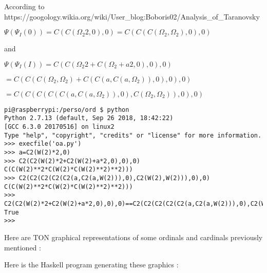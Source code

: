 \documentclass[10pt]{article}
\begin{document}
According to https://googology.wikia.org/wiki/User\_blog:Boboris02/Analysis\_of\_Taranovsky%

$\Psi(\Psi_I(0)) = C(C(\Omega_2 2,0),0) = C(C(C(\Omega_2,\Omega_2),0),0)$

and

$ \Psi(\Psi_I(I)) = C(C(\Omega_2 2+C(\Omega_2+a 2,0),0),0) $

$  = C(C(C(\Omega_2,\Omega_2)+C(C(a,C(a,\Omega_2)),0),0),0) $
 
$  = C(C(C(C(C(a,C(a,\Omega_2)),0),C(\Omega_2,\Omega_2)),0),0) $

\begin{verbatim}
pi@raspberrypi:/perso/ord $ python
Python 2.7.13 (default, Sep 26 2018, 18:42:22)
[GCC 6.3.0 20170516] on linux2
Type "help", "copyright", "credits" or "license" for more information.
>>> execfile('oa.py')
>>> a=C2(W(2)*2,0)
>>> C2(C2(W(2)*2+C2(W(2)+a*2,0),0),0)
C(C(W(2)**2*C(W(2)*C(W(2)**2)**2)))
>>> C2(C2(C2(C2(C2(a,C2(a,W(2))),0),C2(W(2),W(2))),0),0)
C(C(W(2)**2*C(W(2)*C(W(2)**2)**2)))
>>> C2(C2(W(2)*2+C2(W(2)+a*2,0),0),0)==C2(C2(C2(C2(C2(a,C2(a,W(2))),0),C2(W(2),W(2))),0),0)
True
>>>
\end{verbatim}

Here are TON graphical representations of some ordinals and cardinals previously mentioned :



\bigskip

Here is the Haskell program generating these graphics :


\end{document}
